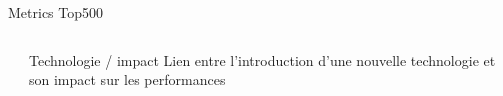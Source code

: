 %
\begin{Frame}{Metrics Top500}
  \begin{columns}[t]
   \begin{column}{8cm}
     \begin{block}{}
     \end{block}
   \end{column}
   \begin{column}{5cm}
     \begin{block}{Technologie / impact}
    Lien entre l'introduction d'une nouvelle technologie et son impact
    sur les performances
     \end{block}
   \end{column}
  \end{columns}


\end{Frame}


